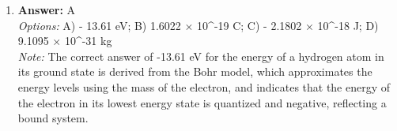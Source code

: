 \documentclass[12pt]{article}
\begin{document}
\begin{enumerate}[label=\arabic*.]
\\ \textit{Options:} A) pH is 10, pOH is 4; B) pH is 4, pOH is 10; C) pH is 3, pOH is 3; D) pH is 4, pOH is 4; E) pH is 1, pOH is 1
\\ \textit{Note:} The pH of 0.0001 N HCl is calculated to be 4 due to the complete ionization of the strong acid, resulting in a hydrogen ion concentration of 0.0001 M, while the pOH of 0.0001 N KOH is also 4 because the concentration of hydroxide ions is equal, leading to a neutral solution at 25°C where pH + pOH equals 14.
\item \textbf{Answer:} A
\\ \textit{Options:} A) - 13.61 eV; B) 1.6022 \ensuremath{\times} 10^-19 C; C) - 2.1802 \ensuremath{\times} 10^-18 J; D) 9.1095 \ensuremath{\times} 10^-31 kg
\\ \textit{Note:} The correct answer of -13.61 eV for the energy of a hydrogen atom in its ground state is derived from the Bohr model, which approximates the energy levels using the mass of the electron, and indicates that the energy of the electron in its lowest energy state is quantized and negative, reflecting a bound system.
\end{enumerate}
\end{document}
